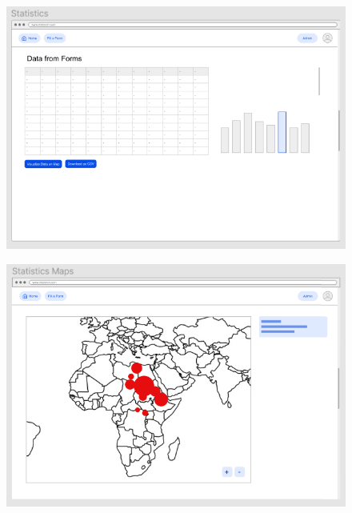 \documentclass{l3proj}
\begin{document}
\begin{figure}[H]
\centering
\begin{minipage}{.5\textwidth}
  \centering
  \includegraphics[width=0.8\linewidth]{images/StatsV1.png}
  \label{fig:StatsV1}
\end{minipage}%
\begin{minipage}{.5\textwidth}
  \centering
  \includegraphics[width=0.8\linewidth]{images/MapV1.png}
  \label{fig:MapV1}
\end{minipage}
\end{figure}



\newpage
\end{document}
